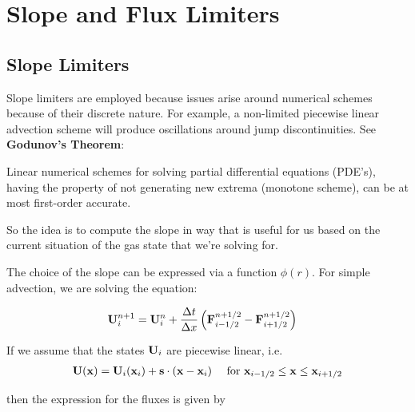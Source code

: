 \newpage


\section{Slope and Flux Limiters}




\subsection{Slope Limiters}

Slope limiters are employed because issues arise around numerical schemes because of their discrete nature.
For example, a non-limited piecewise linear advection scheme will produce oscillations around jump discontinuities.
See \textbf{Godunov's Theorem}:



\begin{displayquote}
	Linear numerical schemes for solving partial differential equations (PDE's), having the property of not generating new extrema (monotone scheme), can be at most first-order accurate.
\end{displayquote}

So the idea is to compute the slope in way that is useful for us based on the current situation of the gas state that we're solving for.

The choice of the slope can be expressed via a function $\phi(r)$.
For simple advection, we are solving the equation:

\begin{align}
	\mathbf{U}_i ^{n+1} &= 
		\mathbf{U}_i^{n} +  \frac{\Delta t}{\Delta x} \left( \mathbf{F}_{i-1/2}^{n+1/2} - \mathbf{F}_{i+1/2}^{n+1/2} \right) \label{eq:advection}
\end{align}


If we assume that the states $\mathbf{U}_i$ are piecewise linear, i.e.
\begin{align}
	\mathbf{U}(\mathbf{x}) = \mathbf{U}_i(\mathbf{x}_i) + \mathbf{s}\cdot (\mathbf{x} - \mathbf{x}_i) \quad \text{ for } \mathbf{x}_{i-1/2} \leq \mathbf{x} \leq \mathbf{x}_{i+1/2} \label{eq:advection-slope}
\end{align}


then the expression for the fluxes is given by


